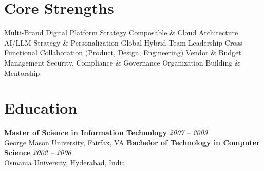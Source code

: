 \documentclass[11pt]{article}
\begin{document}
\section*{Core Strengths}
Multi-Brand Digital Platform Strategy \textbullet{} Composable \& Cloud Architecture \textbullet{} AI/LLM Strategy \& Personalization \textbullet{} Global Hybrid Team Leadership \textbullet{} Cross-Functional Collaboration (Product, Design, Engineering) \textbullet{} Vendor \& Budget Management \textbullet{} Security, Compliance \& Governance \textbullet{} Organization Building \& Mentorship

\section*{Education}
\textbf{Master of Science in Information Technology} \hfill \textit{2007 -- 2009} \\
George Mason University, Fairfax, VA
\newline
\textbf{Bachelor of Technology in Computer Science} \hfill \textit{2002 -- 2006} \\
Osmania University, Hyderabad, India
\end{document}
